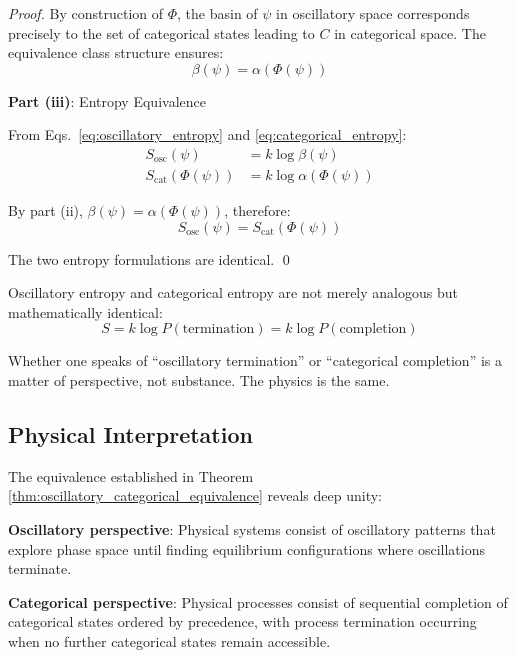 \begin{proof}
By construction of $\Phi$, the basin of $\psi$ in oscillatory space corresponds precisely to the set of categorical states leading to $C$ in categorical space. The equivalence class structure ensures:
\begin{equation}
\beta(\psi) = \alpha(\Phi(\psi))
\end{equation}

\textbf{Part (iii)}: Entropy Equivalence

From Eqs.~\eqref{eq:oscillatory_entropy} and \eqref{eq:categorical_entropy}:
\begin{align}
S_{\text{osc}}(\psi) &= k \log \beta(\psi) \\
S_{\text{cat}}(\Phi(\psi)) &= k \log \alpha(\Phi(\psi))
\end{align}

By part (ii), $\beta(\psi) = \alpha(\Phi(\psi))$, therefore:
\begin{equation}
S_{\text{osc}}(\psi) = S_{\text{cat}}(\Phi(\psi))
\end{equation}

The two entropy formulations are identical. \qed
\end{proof}

\begin{corollary}
\label{cor:unified_entropy}
Oscillatory entropy and categorical entropy are not merely analogous but mathematically identical:
\begin{equation}
S = k \log P(\text{termination}) = k \log P(\text{completion})
\end{equation}

Whether one speaks of ``oscillatory termination'' or ``categorical completion'' is a matter of perspective, not substance. The physics is the same.
\end{corollary}

\subsection{Physical Interpretation}

The equivalence established in Theorem \ref{thm:oscillatory_categorical_equivalence} reveals deep unity:

\textbf{Oscillatory perspective}: Physical systems consist of oscillatory patterns that explore phase space until finding equilibrium configurations where oscillations terminate.

\textbf{Categorical perspective}: Physical processes consist of sequential completion of categorical states ordered by precedence, with process termination occurring when no further categorical states remain accessible.

